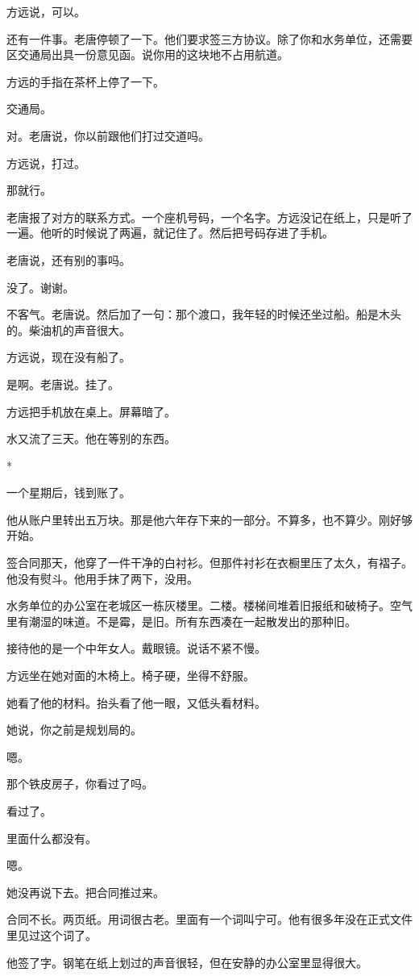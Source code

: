 \documentclass[UTF8,a5paper,11pt,openany]{ctexbook}
\newcommand{\scene}{\vspace{1em}\begin{center}*\quad*\quad*\end{center}\vspace{0.5em}}
\begin{document}
方远说，可以。

还有一件事。老唐停顿了一下。他们要求签三方协议。除了你和水务单位，还需要区交通局出具一份意见函。说你用的这块地不占用航道。

方远的手指在茶杯上停了一下。

交通局。

对。老唐说，你以前跟他们打过交道吗。

方远说，打过。

那就行。

老唐报了对方的联系方式。一个座机号码，一个名字。方远没记在纸上，只是听了一遍。他听的时候说了两遍，就记住了。然后把号码存进了手机。

老唐说，还有别的事吗。

没了。谢谢。

不客气。老唐说。然后加了一句：那个渡口，我年轻的时候还坐过船。船是木头的。柴油机的声音很大。

方远说，现在没有船了。

是啊。老唐说。挂了。

方远把手机放在桌上。屏幕暗了。

水又流了三天。他在等别的东西。


\scene

一个星期后，钱到账了。

他从账户里转出五万块。那是他六年存下来的一部分。不算多，也不算少。刚好够开始。

签合同那天，他穿了一件干净的白衬衫。但那件衬衫在衣橱里压了太久，有褶子。他没有熨斗。他用手抹了两下，没用。

水务单位的办公室在老城区一栋灰楼里。二楼。楼梯间堆着旧报纸和破椅子。空气里有潮湿的味道。不是霉，是旧。所有东西凑在一起散发出的那种旧。

接待他的是一个中年女人。戴眼镜。说话不紧不慢。

方远坐在她对面的木椅上。椅子硬，坐得不舒服。

她看了他的材料。抬头看了他一眼，又低头看材料。

她说，你之前是规划局的。

嗯。

那个铁皮房子，你看过了吗。

看过了。

里面什么都没有。

嗯。

她没再说下去。把合同推过来。

合同不长。两页纸。用词很古老。里面有一个词叫宁可。他有很多年没在正式文件里见过这个词了。

他签了字。钢笔在纸上划过的声音很轻，但在安静的办公室里显得很大。
\end{document}
